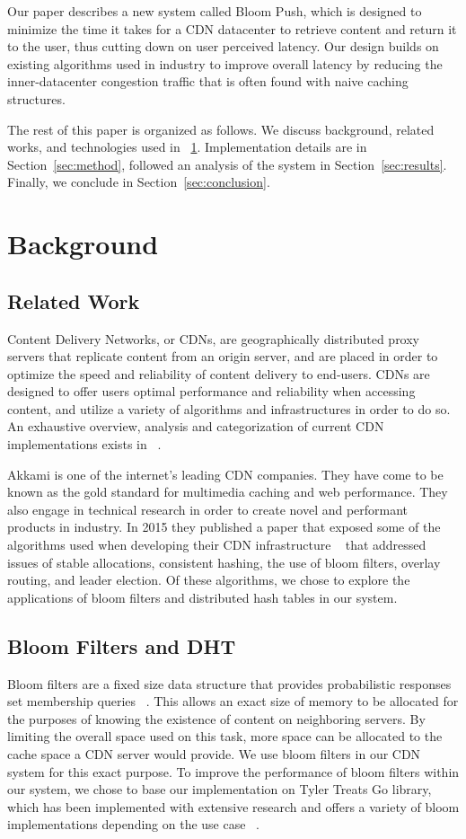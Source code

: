 \documentclass[conference]{IEEEtran}
\begin{document}
Our paper describes a new system called Bloom Push, which is designed to minimize the time it takes for a CDN datacenter to retrieve content and return it to the user, thus cutting down on user perceived latency.  Our design builds on existing algorithms used in industry to improve overall latency by reducing the inner-datacenter congestion traffic that is often found with naive caching structures.

The rest of this paper is organized as follows.  We discuss background, related works, and technologies used in ~\ref{sec:back}.  Implementation details are in Section~\ref{sec:method}, followed an analysis of the system in Section~\ref{sec:results}.  Finally, we conclude in Section~\ref{sec:conclusion}. 

\section{Background}\label{sec:back}
\subsection*{Related Work}
Content Delivery Networks, or CDNs, are geographically distributed proxy servers that replicate content from an origin server, and are placed in order to optimize the speed and reliability of content delivery to end-users. CDNs are designed to offer users optimal performance and reliability when accessing content, and utilize a variety of algorithms and infrastructures in order to do so. An exhaustive overview, analysis and categorization of current CDN implementations exists in ~\cite{PathanTaxonomy}. 

Akkami is one of the internet's leading CDN companies.  They have come to be known as the gold standard for multimedia caching and web performance. They also engage in technical research in order to create novel and performant products in industry. In 2015 they published a paper that exposed some of the algorithms used when developing their CDN infrastructure ~\cite{MaggsNuggets} that addressed issues of stable allocations, consistent hashing, the use of bloom filters, overlay routing, and leader election.  Of these algorithms, we chose to explore the applications of bloom filters and distributed hash tables in our system.

\subsection*{Bloom Filters and DHT}
Bloom filters are a fixed size data structure that provides probabilistic responses set membership queries ~\cite{BroderBloom}.  This allows an exact size of memory to be allocated for the purposes of knowing the existence of content on neighboring servers.  By limiting the overall space used on this task, more space can be allocated to the cache space a CDN server would provide.  We use bloom filters in our CDN system for this exact purpose.  To improve the performance of bloom filters within our system, we chose to base our implementation on Tyler Treats Go library, which has been implemented with extensive research and offers a variety of bloom implementations depending on the use case ~\cite{TreatBloom}.
\end{document}
